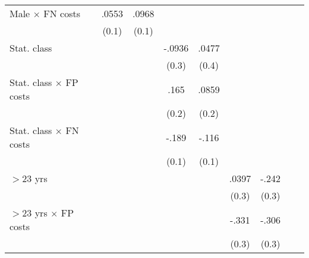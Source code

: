 \begin{table}[htbp]
\begin{tabular}{l*{9}{c}}
Male $\times$ FN costs&                  &    .0553         &    .0968         &                  &                  &                  &                  &                  &                  \\
                &                  &    (0.1)         &    (0.1)         &                  &                  &                  &                  &                  &                  \\
Stat. class     &                  &                  &                  &   -.0936         &    .0477         &                  &                  &                  &                  \\
                &                  &                  &                  &    (0.3)         &    (0.4)         &                  &                  &                  &                  \\
Stat. class $\times$ FP costs&                  &                  &                  &     .165         &    .0859         &                  &                  &                  &                  \\
                &                  &                  &                  &    (0.2)         &    (0.2)         &                  &                  &                  &                  \\
Stat. class $\times$ FN costs&                  &                  &                  &    -.189         &    -.116         &                  &                  &                  &                  \\
                &                  &                  &                  &    (0.1)         &    (0.1)         &                  &                  &                  &                  \\
$>$23 yrs       &                  &                  &                  &                  &                  &    .0397         &    -.242         &                  &                  \\
                &                  &                  &                  &                  &                  &    (0.3)         &    (0.3)         &                  &                  \\
$>$23 yrs $\times$ FP costs&                  &                  &                  &                  &                  &    -.331         &    -.306         &                  &                  \\
                &                  &                  &                  &                  &                  &    (0.3)         &    (0.3)         &                  &                  \\

\end{tabular}
\end{table}
